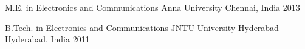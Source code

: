 
\begin{cventries}

  \cventry
  {M.E. in Electronics and Communications} %
  {Anna University} %
  {Chennai, India} %
  {2013} %
  {}

  \cventry
  {B.Tech. in Electronics and Communications} %
  {JNTU University Hyderabad} %
  {Hyderabad, India} %
  {2011} %
  {}

\end{cventries}